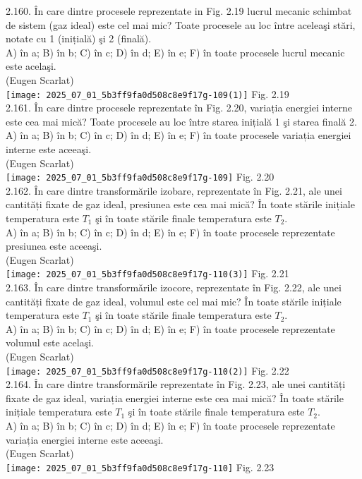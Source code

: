 2.160. În care dintre procesele reprezentate in Fig. 2.19 lucrul mecanic schimbat de sistem (gaz ideal) este cel mai mic? Toate procesele au loc între aceleaşi stări, notate cu 1 (inițială) şi 2 (finală).\\ A) în a; B) în b; C) în c; D) în d; E) în e; F) în toate procesele lucrul mecanic este acelaşi.\\ (Eugen Scarlat)\\ \texttt{[image: 2025\_07\_01\_5b3ff9fa0d508c8e9f17g-109(1)]} Fig. 2.19\\

2.161. În care dintre procesele reprezentate în Fig. 2.20, variația energiei interne este cea mai mică? Toate procesele au loc între starea inițială 1 şi starea finală 2.\\ A) în a; B) în b; C) în c; D) în d; E) în e; F) în toate procesele variația energiei interne este aceeaşi.\\ (Eugen Scarlat)\\ \texttt{[image: 2025\_07\_01\_5b3ff9fa0d508c8e9f17g-109]} Fig. 2.20\\

2.162. În care dintre transformările izobare, reprezentate în Fig. 2.21, ale unei cantități fixate de gaz ideal, presiunea este cea mai mică? În toate stările inițiale temperatura este $T_{1}$ şi în toate stările finale temperatura este $T_{2}$.\\ A) în a; B) în b; C) în c; D) în d; E) în e; F) în toate procesele reprezentate presiunea este aceeaşi.\\ (Eugen Scarlat)\\ \texttt{[image: 2025\_07\_01\_5b3ff9fa0d508c8e9f17g-110(3)]} Fig. 2.21\\

2.163. În care dintre transformǎrile izocore, reprezentate în Fig. 2.22, ale unei cantități fixate de gaz ideal, volumul este cel mai mic? În toate stările inițiale temperatura este $T_{1}$ şi în toate stările finale temperatura este $T_{2}$.\\ A) în a; B) în b; C) în c; D) în d; E) în e; F) în toate procesele reprezentate volumul este acelaşi.\\ (Eugen Scarlat)\\ \texttt{[image: 2025\_07\_01\_5b3ff9fa0d508c8e9f17g-110(2)]} Fig. 2.22\\

2.164. În care dintre transformările reprezentate în Fig. 2.23, ale unei cantități fixate de gaz ideal, variația energiei interne este cea mai mică? În toate stările inițiale temperatura este $T_{1}$ şi în toate stările finale temperatura este $T_{2}$.\\ A) în a; B) în b; C) în c; D) în d; E) în e; F) în toate procesele reprezentate variația energiei interne este aceeaşi.\\ (Eugen Scarlat)\\ \texttt{[image: 2025\_07\_01\_5b3ff9fa0d508c8e9f17g-110]} Fig. 2.23\\

